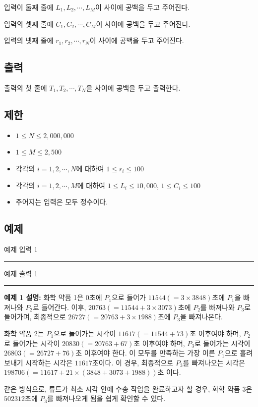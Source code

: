 \documentclass{article}
\def\inputdataname{예제 입력 } %
\def\outputdataname{예제 출력 } %
\newcommand{\iodataNo}[2]{%
	\begin{minipage}{\textwidth}
		\begin{multicols}{2}
			{\inputdataname#2} \\
			\rule{\columnwidth}{1pt}
			
			\columnbreak
			{\outputdataname#2} \\
			\rule{\columnwidth}{1pt}
			
		\end{multicols}
		\vspace{\baselineskip}
	\end{minipage}

}
\begin{document}
입력이 둘째 줄에 $L_1, L_2, \cdots, L_M$이 사이에 공백을 두고 주어진다.

입력의 셋째 줄에 $C_1, C_2, \cdots, C_M$이 사이에 공백을 두고 주어진다.

입력의 넷째 줄에 $r_1, r_2, \cdots, r_N$이 사이에 공백을 두고 주어진다.

\subsection{출력}
출력의 첫 줄에 $T_1, T_2, \cdots, T_N$을 사이에 공백을 두고 출력한다.

\subsection{제한}
\begin{itemize}
	\item $1 \le N \le 2,000,000$
	\item $1 \le M \le 2,500$
	\item 각각의 $i = 1, 2, \cdots, N$에 대하여 $1 \le r_i \le 100$
	\item 각각의 $i = 1, 2, \cdots, M$에 대하여 $1 \le L_i \le 10,000$, $1 \le C_i \le 100$
	\item 주어지는 입력은 모두 정수이다.
\end{itemize}

\subsection{예제}
\iodataNo{rq1}{1}

\textbf{예제 1 설명:} 화학 약품 1은 $0$초에 $P_1$으로 들어가 $11544(=3\times3848)$초에 $P_1$을 빠져나와 $P_2$로 들어간다. 이후, $20763(=11544+3\times3073)$초에 $P_2$를 빠져나와 $P_3$로 들어가며, 최종적으로 $26727(=20763+3\times1988)$초에 $P_3$을 빠져나온다.\newline

화학 약품 2는 $P_1$으로 들어가는 시각이 $11617(=11544+73)$초 이후여야 하며, $P_2$로 들어가는 시각이 $20830(=20763+67)$초 이후여야 하며, $P_3$로 들어가는 시각이 $26803(=26727+76)$초 이후여야 한다. 이 모두를 만족하는 가장 이른 $P_1$으로 흘려보내기 시작하는 시각은 $11617$초이다. 이 경우, 최종적으로 $P_3$를 빠져나오는 시각은 $198706(=11617+21\times(3848+3073+1988))$초 이다.\newline

같은 방식으로, 류트가 최소 시각 안에 수송 작업을 완료하고자 할 경우, 화학 약품 3은 $502312$초에 $P_3$를 빠져나오게 됨을 쉽게 확인할 수 있다.\newline
\end{document}
